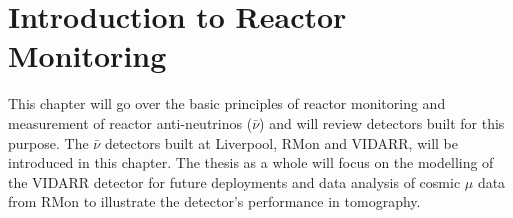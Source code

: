 
\ifpdf
    \graphicspath{{Chapter1/Figs/Raster/}{Chapter1/Figs/PDF/}{Chapter1/Figs/}}
\else
    \graphicspath{{Chapter1/Figs/Vector/}{Chapter1/Figs/}}
\fi

\chapter{Introduction to Reactor Monitoring} \label{Chap:theAimOfVidarr} %
This chapter will go over the basic principles of reactor monitoring and measurement of reactor anti-neutrinos ($\bar{\nu}$) and will review detectors built for this purpose. The $\bar{\nu}$ detectors built at Liverpool, RMon and VIDARR, will be introduced in this chapter. The thesis as a whole will focus on the modelling of the VIDARR detector for future deployments and data analysis of cosmic $\mu$ data from RMon to illustrate the detector's performance in tomography.

